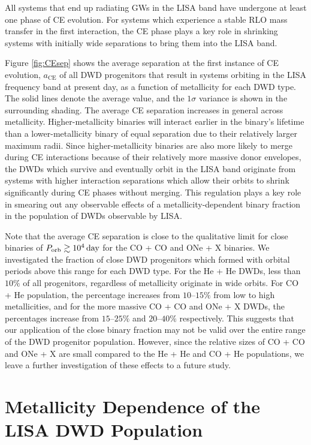 \documentclass[twocolumn, linenumbers]{aastex631}
\begin{document}
All systems that end up radiating GWs in the LISA band have undergone at least one phase of CE evolution. For systems which experience a stable RLO mass transfer in the first interaction, the CE phase plays a key role in shrinking systems with initially wide separations to bring them into the LISA band. 

Figure \ref{fig:CEsep} shows the average separation at the first instance of CE evolution, $a_{\text{CE}}$ of all DWD progenitors that result in systems orbiting in the LISA frequency band at present day, as a function of metallicity for each DWD type. The solid lines denote the average value, and the $1\sigma$ variance is shown in the surrounding shading. The average CE separation increases in general across metallicity. Higher-metallicity binaries will interact earlier in the binary's lifetime than a lower-metallicity binary of equal separation due to their relatively larger maximum radii. Since higher-metallicity binaries are also more likely to merge during CE interactions because of their relatively more massive donor envelopes, the DWDs which survive and eventually orbit in the LISA band originate from systems with higher interaction separations which allow their orbits to shrink significantly during CE phases without merging. This regulation plays a key role in smearing out any observable effects of a metallicity-dependent binary fraction in the population of DWDs observable by LISA. 

Note that the average CE separation is close to the qualitative limit for close binaries of $P_{\rm{orb}}\gtrsim10^{4}\,\rm{day}$ for the CO + CO and ONe + X binaries. We investigated the fraction of close DWD progenitors which formed with orbital periods above this range for each DWD type. For the He + He DWDs, less than $10\%$ of all progenitors, regardless of metallicity originate in wide orbits. For CO + He population, the percentage increases from $10$--$15\%$ from low to high metallicities, and for the more massive CO + CO and ONe + X DWDs, the percentages increase from $15$--$25\%$ and $20$--$40\%$ respectively. This suggests that our application of the close binary fraction may not be valid over the entire range of the DWD progenitor population. However, since the relative sizes of CO + CO and ONe + X are small compared to the He + He and CO + He populations, we leave a further investigation of these effects to a future study.

\section{Metallicity Dependence of the LISA DWD Population}
\label{sec:LISA_met}
\end{document}
